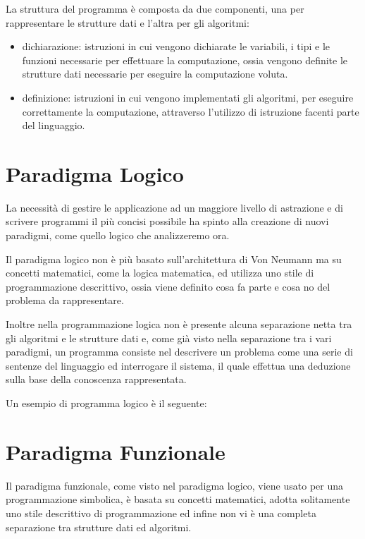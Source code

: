 \documentclass[a4paper]{report}
\begin{document}
La struttura del programma è composta da due componenti, una per rappresentare le strutture dati e l'altra per gli algoritmi:
\begin{itemize}
\item dichiarazione: istruzioni in cui vengono dichiarate le variabili, i tipi e le funzioni necessarie per effettuare
  la computazione, ossia vengono definite le strutture dati necessarie per eseguire la computazione voluta.
\item definizione: istruzioni in cui vengono implementati gli algoritmi, per eseguire correttamente la computazione, attraverso
  l'utilizzo di istruzione facenti parte del linguaggio.
\end{itemize}


\section{Paradigma Logico}
La necessità di gestire le applicazione ad un maggiore livello di astrazione e di scrivere programmi il più concisi possibile ha spinto
alla creazione di nuovi paradigmi, come quello logico che analizzeremo ora.

Il paradigma logico non è più basato sull'architettura di Von Neumann ma su concetti matematici, come la logica matematica,
ed utilizza uno stile di programmazione descrittivo, ossia viene definito cosa fa parte e cosa no del problema da rappresentare.

Inoltre nella programmazione logica non è presente alcuna separazione netta tra gli algoritmi e le strutture dati e, come già
visto nella separazione tra i vari paradigmi, un programma consiste nel descrivere un problema come una serie di sentenze del linguaggio
ed interrogare il sistema, il quale effettua una deduzione sulla base della conoscenza rappresentata.

Un esempio di programma logico è il seguente:


\section{Paradigma Funzionale}
Il paradigma funzionale, come visto nel paradigma logico, viene usato per una programmazione simbolica, è basata su concetti matematici,
adotta solitamente uno stile descrittivo di programmazione ed infine non vi è una completa separazione tra strutture dati ed algoritmi.
\end{document}
